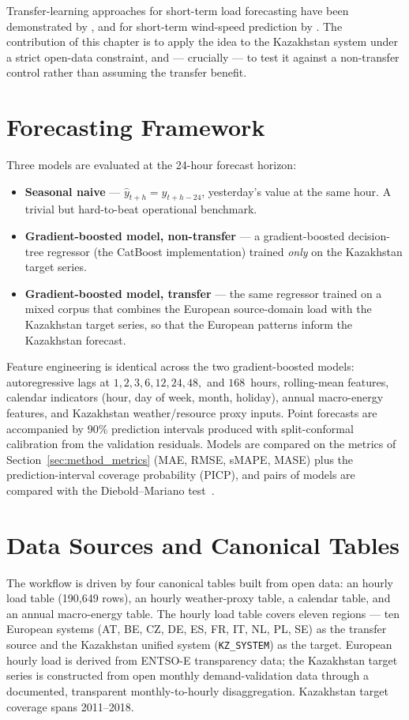 Transfer-learning approaches for short-term load forecasting have been demonstrated by \cite{cai2020transfer}, and for short-term wind-speed prediction by \cite{hu2019transfer}. The contribution of this chapter is to apply the idea to the Kazakhstan system under a strict open-data constraint, and --- crucially --- to test it against a non-transfer control rather than assuming the transfer benefit.

\section{Forecasting Framework}
\label{sec:ml_architecture}

Three models are evaluated at the 24-hour forecast horizon:
\begin{itemize}
    \item \textbf{Seasonal naive} --- $\hat{y}_{t+h} = y_{t+h-24}$, yesterday's value at the same hour. A trivial but hard-to-beat operational benchmark.
    \item \textbf{Gradient-boosted model, non-transfer} --- a gradient-boosted decision-tree regressor (the CatBoost implementation) trained \emph{only} on the Kazakhstan target series.
    \item \textbf{Gradient-boosted model, transfer} --- the same regressor trained on a mixed corpus that combines the European source-domain load with the Kazakhstan target series, so that the European patterns inform the Kazakhstan forecast.
\end{itemize}
Feature engineering is identical across the two gradient-boosted models: autoregressive lags at $1, 2, 3, 6, 12, 24, 48,$ and $168$~hours, rolling-mean features, calendar indicators (hour, day of week, month, holiday), annual macro-energy features, and Kazakhstan weather/resource proxy inputs. Point forecasts are accompanied by 90\% prediction intervals produced with split-conformal calibration from the validation residuals. Models are compared on the metrics of Section~\ref{sec:method_metrics} (MAE, RMSE, sMAPE, MASE) plus the prediction-interval coverage probability (PICP), and pairs of models are compared with the Diebold--Mariano test~\cite{dieboldmariano1995}.

\section{Data Sources and Canonical Tables}
\label{sec:ml_eu_data}

The workflow is driven by four canonical tables built from open data: an hourly load table (190{,}649 rows), an hourly weather-proxy table, a calendar table, and an annual macro-energy table. The hourly load table covers eleven regions --- ten European systems (AT, BE, CZ, DE, ES, FR, IT, NL, PL, SE) as the transfer source and the Kazakhstan unified system (\verb|KZ_SYSTEM|) as the target. European hourly load is derived from ENTSO-E transparency data; the Kazakhstan target series is constructed from open monthly demand-validation data through a documented, transparent monthly-to-hourly disaggregation. Kazakhstan target coverage spans 2011--2018.

